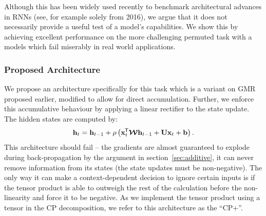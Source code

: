 Although this has been widely used recently to benchmark architectural
advances in RNNs (see, for example 
\autocite{Zhang2016, Barone2016, Gao2016, Neyshabur2016, Cooijmans2016}
solely from 2016), we argue that it does not necessarily provide a useful test of
a model's capabilities. We show this by achieving excellent performance
on the more challenging permuted task with a models which fail miserably
in real world applications. 


\subsubsection{Proposed Architecture}
We propose an architecture specifically for this task which is a variant on
GMR proposed earlier, modified to allow for direct accumulation.
Further, we enforce this accumulative behaviour by applying a linear rectifier
to the state update. The hidden states are computed by:
\begin{equation}\label{eq:cpplus}
	\mathbf{h}_t = \mathbf{h}_{t-1} + \rho\left( \mathbf{x}^{\mkern-1.5mu\mathsf{T}}_t\bm{\mathcal{W}}\mathbf{h}_{t-1} + \mathbf{U}\mathbf{x}_t + \mathbf{b}\right).
\end{equation} This architecture should fail -- the gradients are almost
guaranteed to explode during back-propagation by the argument in section~\ref{sec:additive},
it can never remove information from its states (the state updates must be non-negative).
The only way it can make a context-dependent decision to ignore certain inputs is
if the tensor product is able to outweigh the rest of the calculation before the
non-linearity and force it to be negative. As we implement the tensor product
using a tensor in the CP decomposition, we refer to this architecture as the
``CP+''.
%

